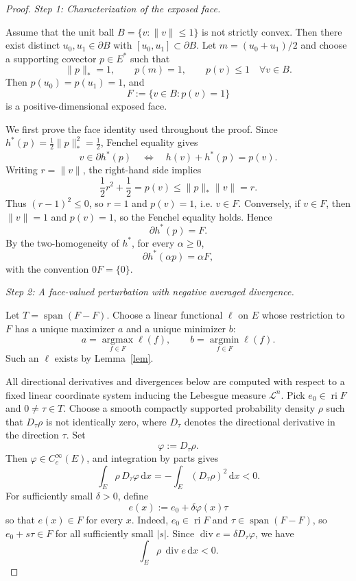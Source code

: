 \documentclass[a4paper,11pt]{article}
\numberwithin{equation}{section}
\newcommand{\ri}{\operatorname{ri}}
\newcommand{\diver}{\operatorname{div}}
\newcommand{\argmin}{\operatorname*{argmin}}
\newcommand{\argmax}{\operatorname*{argmax}}
\newcommand{\dd}{\mathrm d}
\begin{document}
	\begin{proof}
	
	\emph{Step 1: Characterization of the exposed face.} 
	
	Assume that the unit ball $B=\{v:\|v\|\le1\}$ is not strictly convex. Then there exist distinct $u_0,u_1\in\partial B$ with $[u_0,u_1]\subset\partial B$. Let $m=(u_0+u_1)/2$ and choose a supporting covector $p\in E^*$ such that
		\[
		\|p\|_*=1,
		\qquad p(m)=1,
		\qquad p(v)\le1\quad\forall v\in B.
		\]
		Then $p(u_0)=p(u_1)=1$, and
		\[
		F:=\{v\in B:p(v)=1\}
		\]
		is a positive-dimensional exposed face.
		
		We first prove the face identity used throughout the proof. Since $h^*(p)=\frac12\|p\|_*^2=\frac12$, Fenchel equality gives
		\[
		v\in\partial h^*(p)
		\quad\Longleftrightarrow\quad
		h(v)+h^*(p)=p(v).
		\]
		Writing $r=\|v\|$, the right-hand side implies
		\[
		\frac12 r^2+\frac12=p(v)\le \|p\|_*\|v\|=r.
		\]
		Thus $(r-1)^2\le0$, so $r=1$ and $p(v)=1$, i.e. $v\in F$. Conversely, if $v\in F$, then $\|v\|=1$ and $p(v)=1$, so the Fenchel equality holds. Hence
		\[
		\partial h^*(p)=F.
		\]
		By the two-homogeneity of $h^*$, for every $\alpha\ge0$,
		\[
		\partial h^*(\alpha p)=\alpha F,
		\]
		with the convention $0F=\{0\}$.
		
		\medskip
	\noindent	\emph{Step 2: A face-valued perturbation with negative averaged divergence.}
		
		Let $T=\operatorname{span}(F-F)$. Choose a linear functional $\ell$ on $E$ whose restriction to $F$ has a unique maximizer $a$ and a unique minimizer $b$:
		\[
		a=\argmax_{f\in F}\ell(f),
		\qquad b=\argmin_{f\in F}\ell(f).
		\]
		Such an $\ell$ exists by Lemma~\ref{lem}.
		
		All directional derivatives and divergences below are computed with respect to a fixed linear coordinate system inducing the Lebesgue measure \(\mathcal L^n\).
		Pick $e_0\in\ri F$ and $0\ne\tau\in T$. Choose a smooth compactly supported probability density \(\rho\) such that \(D_\tau\rho\) is not identically zero, where \(D_\tau\) denotes the directional derivative in the direction \(\tau\). Set
		\[
		\varphi:=D_\tau\rho.
		\]
		Then \(\varphi\in C_c^\infty(E)\), and integration by parts gives
		\[
		\int_E \rho\,D_\tau\varphi\,\dd x
		=-\int_E (D_\tau\rho)^2\,\dd x<0.
		\]
		For sufficiently small $\delta>0$, define
		\[
		e(x):=e_0+\delta\varphi(x)\tau
		\]
		so that $e(x)\in F$ for every $x$. Indeed, \(e_0\in\ri F\) and
		\(\tau\in\operatorname{span}(F-F)\), so \(e_0+s\tau\in F\) for all sufficiently small
		\(|s|\). Since \(\diver e=\delta D_\tau\varphi\), we have
		\begin{equation}\label{eq:face-negative-divergence}
			\int_E \rho\,\diver e\,\dd x<0.
		\end{equation}
		

\end{proof}
\end{document}

